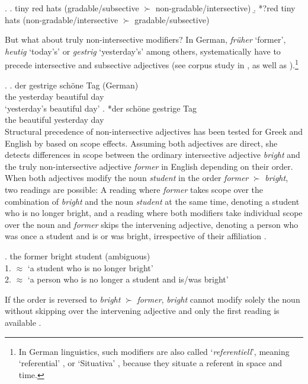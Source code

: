 \ex. \a. tiny red hats (gradable/subsective $\succ$ non-gradable/intersective)
\b. *?red tiny hats (non-gradable/intersective $\succ$ gradable/subsective) \\ \null \hfill\citep[36]{svenonius:2008:position}

But what about truly non-intersective modifiers? In  German, \textit{früher} `former’, \textit{heutig} `today's' or \textit{gestrig} `yesterday’s’ among others, systematically have to precede intersective and subsective adjectives (see corpus study in \citealt{trost:2006:das}, as well as \citealt{eichinger:1991:ganz}).\footnote{In German linguistics, such modifiers are also called `\textit{referentiell}', meaning `referential’ \citep{trost:2006:das}, or `Situativa' \citep{eichinger:1979:syntaktische, eichinger:1991:ganz}, because they situate a referent in space and time.}

\ex. \ag. der gestrige schöne Tag (German)\\
the yesterday beautiful day\\
`yesterday's beautiful day'
\bg. *der schöne gestrige Tag\\
the beautiful yesterday day\\

Structural precedence of non-intersective adjectives has been tested for  Greek and  English by \citet{panayidou:2013:in} based on scope effects. Assuming both adjectives are direct, she detects differences in scope between the ordinary intersective adjective \textit{bright} and the truly non-intersective adjective \textit{former} in English depending on their order. When both adjectives modify the noun \textit{student} in the order \textit{former} $\succ$ \textit{bright}, two readings are possible: A reading where \textit{former} takes scope over the combination of \textit{bright} and the noun \textit{student} at the same time, denoting a student who is no longer bright, and a reading where both modifiers take individual scope over the noun and \textit{former} skips the intervening adjective, denoting a person who was once a student and is or was bright, irrespective of their affiliation \citep[106]{panayidou:2013:in}.

\ex. the former bright student (ambiguous)\\
1. $\approx$ `a student who is no longer bright’\\
2. $\approx$ `a person who is no longer a student and is/was bright’

If the order is reversed to \textit{bright} $\succ$ \textit{former}, \textit{bright} cannot modify solely the noun without skipping over the intervening adjective and only the first reading is available \citep[106]{panayidou:2013:in}.


